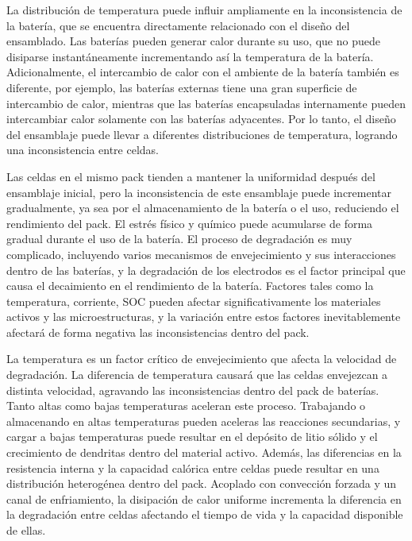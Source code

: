 \documentclass[10pt,a4paper]{article}
\newcounter{subsubsubsection}[subsubsection]
\begin{document}
La distribuci\'on de temperatura puede influir ampliamente en la inconsistencia
de la bater\'ia, que se encuentra directamente relacionado con el diseño del
ensamblado. Las bater\'ias pueden generar calor durante su uso, que no puede
disiparse instant\'aneamente incrementando as\'i la temperatura de la bater\'ia.
Adicionalmente, el intercambio de calor con el ambiente de la bater\'ia
tambi\'en es diferente, por ejemplo, las bater\'ias externas tiene una gran
superficie de intercambio de calor, mientras que las bater\'ias encapsuladas
internamente pueden intercambiar calor solamente con las bater\'ias adyacentes.
Por lo tanto, el diseño del ensamblaje puede llevar a diferentes distribuciones
de temperatura, logrando una inconsistencia entre celdas.


Las celdas en el mismo pack tienden a mantener la uniformidad despu\'es del
ensamblaje inicial, pero la inconsistencia de este ensamblaje puede incrementar
gradualmente, ya sea por el almacenamiento de la bater\'ia o el uso, reduciendo
el rendimiento del pack. El estr\'es f\'isico y qu\'imico puede acumularse
de forma gradual durante el uso de la bater\'ia. El proceso de degradaci\'on es
muy complicado, incluyendo varios mecanismos de envejecimiento y sus
interacciones dentro de las bater\'ias, y la degradaci\'on de los electrodos es
el factor principal que causa el decaimiento en el rendimiento de la bater\'ia.
Factores tales como la temperatura, corriente, \acrshort{SOC} pueden afectar
significativamente los materiales activos y las microestructuras, y la
variaci\'on entre estos factores inevitablemente afectar\'a de forma negativa
las inconsistencias dentro del pack.

La temperatura es un factor cr\'itico de envejecimiento que afecta la velocidad
de degradaci\'on. La diferencia de temperatura causar\'a que las celdas
envejezcan a distinta velocidad, agravando las inconsistencias dentro del pack
de bater\'ias. Tanto altas como bajas temperaturas aceleran este proceso.
Trabajando o almacenando en altas temperaturas pueden aceleras las reacciones
secundarias, y cargar a bajas temperaturas puede resultar en el dep\'osito de
litio s\'olido y el crecimiento de dendritas dentro del material activo.
Adem\'as, las diferencias en la resistencia interna y la capacidad cal\'orica
entre celdas puede resultar en una distribuci\'on heterog\'enea dentro del pack.
Acoplado con convecci\'on forzada y un canal de enfriamiento, la disipaci\'on de
calor uniforme incrementa la diferencia en la degradaci\'on entre celdas
afectando el tiempo de vida y la capacidad disponible de ellas. 
\end{document}

